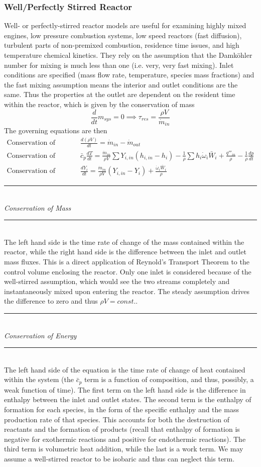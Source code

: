 \documentclass[11pt]{article}
\newcommand{\Header}[1]{\noindent\rule{\textwidth}{0.4pt}\\[0.3cm]\indent \large{\textit{#1}}\normalsize{}\\[-0.1cm]\noindent\rule{\textwidth}{0.4pt}}
\begin{document}
\subsubsection{Well/Perfectly Stirred Reactor}
Well- or perfectly-stirred reactor models are useful for examining highly mixed engines, low pressure combustion systems, low speed reactors (fast diffusion), turbulent parts of non-premixed combustion, residence time issues, and high temperature chemical kinetics. They rely on the assumption that the Damk{\"o}hler number for mixing is much less than one (i.e. very, very fast mixing). Inlet conditions are specified (mass flow rate, temperature, species mass fractions) and the fast mixing assumption means the interior and outlet conditions are the same. Thus the properties at the outlet are dependent on the resident time within the reactor, which is given by the conservation of mass
$$\frac{d}{dt}m_{sys} = 0\implies \tau_{res} = \frac{\rho V}{\dot m_{in}}$$
The governing equations are then
\begin{align*}
\textrm{Conservation of Mass: } &\frac{d(\rho V)}{dt} = \dot m_{in} - \dot m_{out}\\
\textrm{Conservation of Energy: } &\bar c_p\frac{dT}{dt} = \frac{\dot m_{in}}{\rho V}\sum Y_{i,in}(h_{i,in}-h_i) - \frac{1}{\rho}\sum h_i\dot\omega_i\bar W_i  + \frac{q'''_{in}}{\rho}-\frac{1}{\rho}\frac{dp}{dt}\\
\textrm{Conservation of Species: } &\frac{dY_i}{dt} = \frac{\dot m_{in}}{\rho V}(Y_{i,in}-Y_i) + \frac{\dot\omega_i\bar W_i}{\rho}
\end{align*}

\Header{Conservation of Mass}\\

The left hand side is the time rate of change of the mass contained within the reactor, while the right hand side is the difference between the inlet and outlet mass fluxes. This is a direct application of Reynold's Transport Theorem to the control volume enclosing the reactor. Only one inlet is considered because of the well-stirred assumption, which would see the two streams completely and instantaneously mixed upon entering the reactor. The steady assumption drives the difference to zero and thus $\rho V = const.$.

\Header{Conservation of Energy}\\

The left hand side of the equation is the time rate of change of heat contained within the system (the $\bar c_p$ term is a function of composition, and thus, possibly, a weak function of time). The first term on the left hand side is the difference in enthalpy between the inlet and outlet states. The second term is the enthalpy of formation for each species, in the form of the specific enthalpy and the mass production rate of that species. This accounts for both the destruction of reactants and the formation of products (recall that enthalpy of formation is negative for exothermic reactions and positive for endothermic reactions). The third term is volumetric heat addition, while the last is a work term. We may assume a well-stirred reactor to be isobaric and thus can neglect this term.
\end{document}
